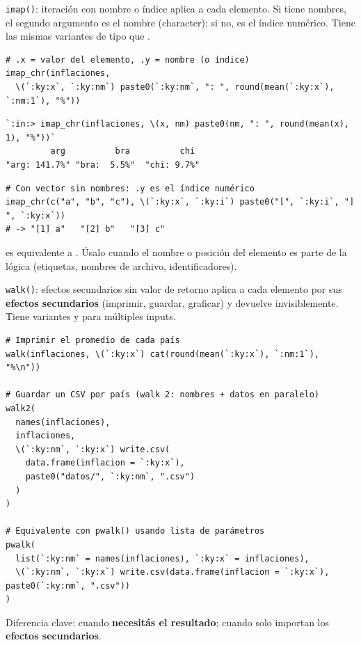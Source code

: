 \documentclass[8pt]{beamer}
\begin{document}
	\begin{frame}[fragile]{\texttt{imap()}: iteración con nombre o índice}
		 aplica  a cada elemento. Si  tiene nombres, el segundo argumento es el nombre (character); si no, es el índice numérico. Tiene las mismas variantes de tipo que .

\begin{lstlisting}[style=RScript]
# .x = valor del elemento, .y = nombre (o índice)
imap_chr(inflaciones,
  \(`:ky:x`, `:ky:nm`) paste0(`:ky:nm`, ": ", round(mean(`:ky:x`), `:nm:1`), "%"))
\end{lstlisting}
\begin{lstlisting}[style=RConsole]
`:in:> imap_chr(inflaciones, \(x, nm) paste0(nm, ": ", round(mean(x), 1), "%"))`
         arg          bra          chi
"arg: 141.7%" "bra:  5.5%"  "chi: 9.7%"
\end{lstlisting}

\begin{lstlisting}[style=RScript]
# Con vector sin nombres: .y es el índice numérico
imap_chr(c("a", "b", "c"), \(`:ky:x`, `:ky:i`) paste0("[", `:ky:i`, "] ", `:ky:x`))
# -> "[1] a"   "[2] b"   "[3] c"
\end{lstlisting}

		\begin{block}{}
			 es equivalente a . Úsalo cuando el nombre o posición del elemento es parte de la lógica (etiquetas, nombres de archivo, identificadores).
		\end{block}
	\end{frame}


	\begin{frame}[fragile]{\texttt{walk()}: efectos secundarios sin valor de retorno}
		 aplica  a cada elemento por sus \textbf{efectos secundarios} (imprimir, guardar, graficar) y devuelve  invisiblemente. Tiene variantes  y  para múltiples inputs.

\begin{lstlisting}[style=RScript]
# Imprimir el promedio de cada país
walk(inflaciones, \(`:ky:x`) cat(round(mean(`:ky:x`), `:nm:1`), "%\n"))

# Guardar un CSV por país (walk 2: nombres + datos en paralelo)
walk2(
  names(inflaciones),
  inflaciones,
  \(`:ky:nm`, `:ky:x`) write.csv(
    data.frame(inflacion = `:ky:x`),
    paste0("datos/", `:ky:nm`, ".csv")
  )
)

# Equivalente con pwalk() usando lista de parámetros
pwalk(
  list(`:ky:nm` = names(inflaciones), `:ky:x` = inflaciones),
  \(`:ky:nm`, `:ky:x`) write.csv(data.frame(inflacion = `:ky:x`), paste0(`:ky:nm`, ".csv"))
)
\end{lstlisting}

		\begin{block}{}
			Diferencia clave:  cuando \textbf{necesitás el resultado};  cuando solo importan los \textbf{efectos secundarios}.
		\end{block}
	\end{frame}
\end{document}

